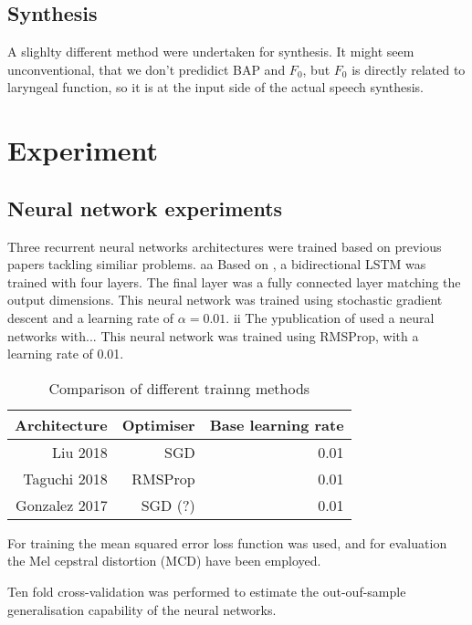 \documentclass[a4paper]{article}
\begin{document}
\subsection{Synthesis}

A slighlty different method were undertaken for synthesis. It might
seem unconventional, that we don't predidict BAP and $ F_0 $, but $ F_0 $
is directly related to laryngeal function, so it is at the input side
of the actual speech synthesis.

\section{Experiment}

\subsection{Neural network experiments}

Three recurrent neural networks architectures were trained based on previous
papers tackling similiar problems.
aa
Based on \cite{Liu2018}, a bidirectional LSTM was trained with four layers.
The final layer was a fully connected layer matching the output dimensions.
This neural network was trained using stochastic gradient descent and
a learning rate of \( \alpha = 0.01 \).
ii
The ypublication of \cite{Taguchi} used a neural networks with...
This neural network was trained using RMSProp, with a learning rate of 0.01.

\begin{table}[th]
  \caption{Comparison of different trainng methods}
  \label{tab:example}
  \centering
  \begin{tabular}{ r r r }
    \toprule
    \textbf{Architecture} & \textbf{Optimiser} & \textbf{Base learning rate} \\
    \midrule
    Liu 2018 & SGD & 0.01 \\
    Taguchi 2018 & RMSProp & 0.01       \\
    Gonzalez 2017 & SGD (?) & 0.01               \\
    \bottomrule
  \end{tabular}
  
\end{table}

For training the mean squared error loss function was used, and for
evaluation the Mel cepstral distortion (MCD) have been employed. \cite{Kubichek1993}



Ten fold cross-validation was performed to estimate the out-ouf-sample
generalisation capability of the neural networks.
\end{document}
